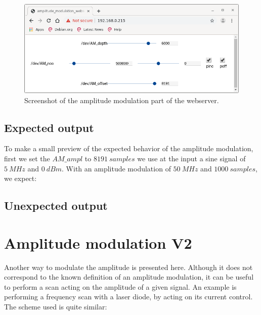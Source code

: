 \documentclass[12pt,oneside]{article}
\begin{document}
\begin{figure}[!h!tb]
	\begin{center}
		\includegraphics[width=14cm]{webserver/AM_V1.png}
		\caption{Screenshot of the amplitude modulation part of the webserver.}
		\label{fig:amplModWsv1}
	\end{center}
\end{figure}
\vspace{-1cm}

\subsection{Expected output}

To make a small preview of the expected behavior of the amplitude modulation, first we set the $AM\_ampl$ to $8191~samples$  we use at the input a sine signal of $5~MHz$ and $0~dBm$.
With an amplitude modulation of $50~MHz$ and $1000~samples$, we expect: \newpage

\subsection{Unexpected output}

\section{Amplitude modulation V2}\label{sect:AM2}

Another way to modulate the amplitude is presented here. Although it does not correspond to the known definition of an amplitude modulation, it can be useful to perform a scan acting on the amplitude of a given signal. An example is performing a frequency scan with a laser diode, by acting on its current control. The scheme used is quite similar:
\end{document}
